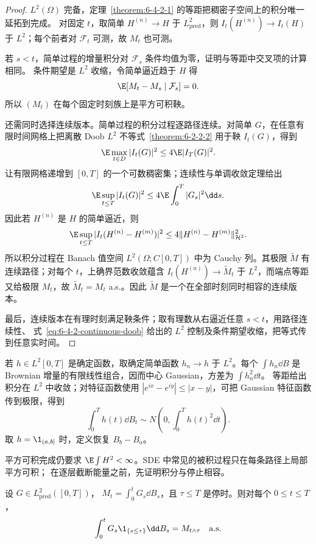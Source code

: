 \begin{proof}
$L^2(\Omega)$ 完备，定理~\ref{theorem:6-4-2-1} 的等距把稠密子空间上的积分唯一延拓到完成。
对固定 $t$，取简单 $H^{(n)}\to H$ 于 $L^2_{\mathrm{pred}}$，则
$I_t(H^{(n)})\to I_t(H)$ 于 $L^2$；每个前者对 $\mathcal F_t$ 可测，故 $M_t$ 也可测。

若 $s<t$，简单过程的增量积分对 $\mathcal F_s$ 条件均值为零，证明与等距中交叉项的计算相同。
条件期望是 $L^2$ 收缩，令简单逼近趋于 $H$ 得
\[
 \E[M_t-M_s\mid\mathcal F_s]=0.
\]
所以 $(M_t)$ 在每个固定时刻族上是平方可积鞅。

还需同时选择连续版本。简单过程的积分过程逐路径连续。对简单 $G$，在任意有限时间网格上把离散
Doob $L^2$ 不等式~\ref{theorem:6-2-2-2} 用于鞅 $I_t(G)$，得到
\[
 \E\max_{t\in D}|I_t(G)|^2\le4\E|I_T(G)|^2.
\]
让有限网格递增到 $[0,T]$ 的一个可数稠密集；连续性与单调收敛定理给出
\begin{equation}\label{eq:6-4-2-continuous-doob}
 \E\sup_{t\le T}|I_t(G)|^2
 \le4\E\int_0^T|G_s|^2\dd s.
\end{equation}
因此若 $H^{(n)}$ 是 $H$ 的简单逼近，则
\[
 \E\sup_{t\le T}|I_t(H^{(n)}-H^{(m)})|^2
 \le4\|H^{(n)}-H^{(m)}\|_{\mathcal H^2}^2.
\]
所以积分过程在 Banach 值空间 $L^2(\Omega;C[0,T])$ 中为 Cauchy 列。其极限 $\widetilde M$
有连续路径；对每个 $t$，上确界范数收敛蕴含
$I_t(H^{(n)})\to\widetilde M_t$ 于 $L^2$，而端点等距又给极限 $M_t$，故
$\widetilde M_t=M_t$ a.s.。因此 $\widetilde M$ 是一个在全部时刻同时相容的连续版本。

最后，连续版本在有理时刻满足鞅条件；取有理数从右逼近任意 $s<t$，用路径连续性、
式~\eqref{eq:6-4-2-continuous-doob} 给出的 $L^2$ 控制及条件期望收缩，把等式传到任意实时间。
\end{proof}

\begin{example}[确定被积函数]\label{ex:6-4-2-1}
若 $h\in L^2[0,T]$ 是确定函数，取确定简单函数 $h_n\to h$ 于 $L^2$。每个
$\int h_n\dd B$ 是 Brownian 增量的有限线性组合，因而中心 Gaussian，方差为
$\int h_n^2\dd t$。\Ito{} 等距给出积分在 $L^2$ 中收敛；对特征函数使用
$|e^{ix}-e^{iy}|\le|x-y|$，可把 Gaussian 特征函数传到极限，得到
\[
 \int_0^Th(t)\dd B_t\sim N\!\left(0,\int_0^Th(t)^2\dd t\right).
\]
取 $h=\1_{(a,b]}$ 时，定义恢复 $B_b-B_a$。
\end{example}

平方可积完成仍要求 $\E\int H^2<\infty$。SDE 中常见的被积过程只在每条路径上局部平方可积；
在逐层截断能量之前，先证明积分与停止相容。

\begin{lemma}\label{lemma:6-4-2-stopping-integral}
设 $G\in L^2_{\mathrm{pred}}([0,T])$，
$M_t=\int_0^tG_s\dd B_s$，且 $\tau\le T$ 是停时。则对每个 $0\le t\le T$，
\[
 \int_0^tG_s\1_{\{s\le\tau\}}\dd B_s=M_{t\wedge\tau}
 \quad\text{a.s.}
\]
\end{lemma}

